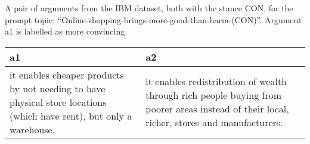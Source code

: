 \centering
\caption{A pair of arguments from the IBM dataset, both with the stance CON, for the prompt topic: ``Online-shopping-brings-more-good-than-harm-(CON)''. Argument a1 is labelled as more convincing.}
\begin{tabular}{p{6cm}|p{6cm}}
\toprule
                                                                                                                   a1 &                                                                                                                                          a2 \\
\midrule
 it enables cheaper products by not needing to have physical store locations (which have rent), but only a warehouse. &  it enables redistribution of wealth through rich people buying from poorer areas instead of their local, richer, stores and manufacturers. \\
\bottomrule
\end{tabular}
